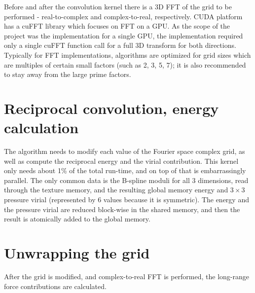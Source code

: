 \documentclass[12pt,a4paper]{report}
\newcommand{\draft}[1]{#1}
\begin{document}
Before and after the convolution kernel there is a 3D FFT of the grid to be performed - real-to-complex and complex-to-real, respectively. 
CUDA platform has a cuFFT library which focuses on FFT on a GPU. 
As the scope of the project was the implementation for a single GPU, the implementation required only a single cuFFT function call for a full 3D transform for both directions. 
Typically for FFT implementations, algorithms are optimized for grid sizes which are multiples of certain small factors (such as 2, 3, 5, 7); it is also recommended to stay away from the large prime factors.

\section{Reciprocal convolution, energy calculation}


The algorithm needs to modify each value of the Fourier space complex grid, as well as compute the reciprocal energy and the virial contribution. This kernel only needs about \draft{1\%} of the total run-time, and on top of that is embarrassingly parallel. The only common data is the B-spline moduli for all 3 dimensions, read through the texture memory, and the resulting global memory energy and $3 \times 3$ pressure virial (represented by 6 values because it is symmetric). The energy and the pressure virial are reduced block-wise in the shared memory, and then the result is atomically added to the global memory.

\section{Unwrapping the grid}
After the grid is modified, and complex-to-real FFT is performed, the long-range force contributions are calculated.
\end{document}
